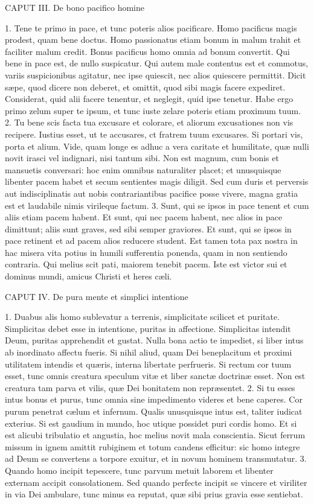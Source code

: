 CAPUT III.
De bono pacifico homine

1. Tene te primo in pace, et tunc poteris alios pacificare. Homo pacificus magis prodest, quam bene doctus. Homo passionatus etiam bonum in malum trahit et faciliter malum credit. Bonus pacificus homo omnia ad bonum convertit. Qui bene in pace est, de nullo suspicatur. Qui autem male contentus est et commotus, variis suspicionibus agitatur, nec ipse quiescit, nec alios quiescere permittit. Dicit sæpe, quod dicere non deberet, et omittit, quod sibi magis facere expediret. Considerat, quid alii facere tenentur, et neglegit, quid ipse tenetur. Habe ergo primo zelum super te ipsum, et tunc iuste zelare poteris etiam proximum tuum.
2. Tu bene scis facta tua excusare et colorare, et aliorum excusationes non vis recipere. Iustius esset, ut te accusares, ct fratrem tuum excusares. Si portari vis, porta et alium. Vide, quam longe es adhuc a vera caritate et humilitate, quæ nulli novit irasci vel indignari, nisi tantum sibi. Non est magnum, cum bonis et mansuetis conversari: hoc enim omnibus naturaliter placet; et unusquisque libenter pacem habet et secum sentientes magis diligit. Sed cum duris et perversis aut indisciplinatis aut nobis contrariantibus pacifice posse vivere, magna gratia est et laudabile nimis virileque factum.
3. Sunt, qui se ipsos in pace tenent et cum aliis etiam pacem habent. Et sunt, qui nec pacem habent, nec alios in pace dimittunt; aliis sunt graves, sed sibi semper graviores. Et sunt, qui se ipsos in pace retinent et ad pacem alios reducere student. Est tamen tota pax nostra in hac misera vita potius in humili sufferentia ponenda, quam in non sentiendo contraria. Qui melius scit pati, maiorem tenebit pacem. Iste est victor sui et dominus mundi, amicus Christi et heres cæli.


CAPUT IV.
De pura mente et simplici intentione

1. Duabus alis homo sublevatur a terrenis, simplicitate scilicet et puritate. Simplicitas debet esse in intentione, puritas in affectione. Simplicitas intendit Deum, puritas apprehendit et gustat. Nulla bona actio te impediet, si liber intus ab inordinato affectu fueris. Si nihil aliud, quam Dei beneplacitum et proximi utilitatem intendis et quæris, interna libertate perfrueris. Si rectum cor tuum esset, tunc omnis creatura speculum vitæ et liber sanctæ doctrinæ esset. Non est creatura tam parva et vilis, quæ Dei bonitatem non repræsentet.
2. Si tu esses intus bonus et purus, tunc omnia sine impedimento videres et bene caperes. Cor purum penetrat cælum et infernum. Qualis unusquisque intus est, taliter iudicat exterius. Si est gaudium in mundo, hoc utique possidet puri cordis homo. Et si est alicubi tribulatio et angustia, hoc melius novit mala conscientia. Sicut ferrum missum in ignem amittit rubiginem et totum candens efficitur: sic homo integre ad Deum se convertens a torpore exuitur, et in novum hominem transmutatur.
3. Quando homo incipit tepescere, tunc parvum metuit laborem et libenter externam accipit consolationem. Sed quando perfecte incipit se vincere et viriliter in via Dei ambulare, tunc minus ea reputat, quæ sibi prius gravia esse sentiebat.


